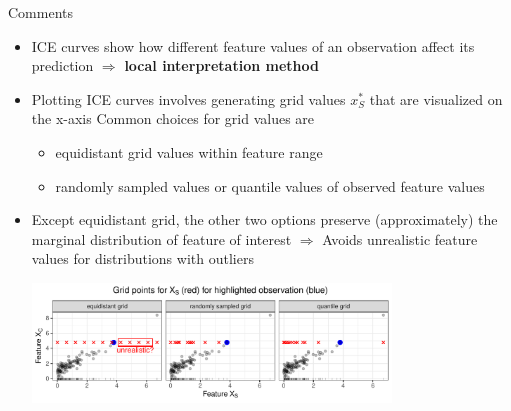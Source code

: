 \documentclass[11pt,compress,t,notes=noshow, aspectratio=169, xcolor=table]{beamer}
\begin{document}
\begin{frame}{Comments}
\begin{itemize}
\item ICE curves show how different feature values of an observation affect its prediction \newline $\Rightarrow$ \textbf{local interpretation method}
\item Plotting ICE curves involves generating grid values $x_S^*$ that are visualized on the x-axis
Common choices for grid values are
\begin{itemize}
\item equidistant grid values within feature range
\item randomly sampled values or quantile values of observed feature values
\end{itemize}
\item Except equidistant grid, the other two options preserve (approximately) the marginal distribution of feature of interest
$\Rightarrow$ Avoids unrealistic feature values for distributions with outliers

\vspace{3pt}
\centering
\includegraphics[width=0.75\textwidth, trim=0cm 0cm 0cm 0cm, clip]{figure/sampling}

\end{itemize}
\end{frame}

\endlecture
\end{document}

